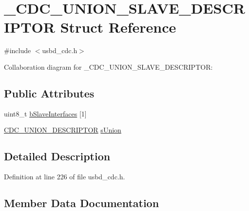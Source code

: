 \hypertarget{struct__CDC__UNION__1SLAVE__DESCRIPTOR}{}\section{\+\_\+\+C\+D\+C\+\_\+\+U\+N\+I\+O\+N\+\_\+S\+L\+A\+V\+E\+\_\+\+D\+E\+S\+C\+R\+I\+P\+T\+OR Struct Reference}
\label{struct__CDC__UNION__1SLAVE__DESCRIPTOR}


{\ttfamily \#include $<$usbd\+\_\+cdc.\+h$>$}



Collaboration diagram for \+\_\+\+C\+D\+C\+\_\+\+U\+N\+I\+O\+N\+\_\+S\+L\+A\+V\+E\+\_\+\+D\+E\+S\+C\+R\+I\+P\+T\+OR\+:
\subsection*{Public Attributes}
\begin{DoxyCompactItemize}
\item 
uint8\+\_\+t \hyperlink{struct__CDC__UNION__1SLAVE__DESCRIPTOR_a4a4b8383cd96d9ba6fa83b35bb32c94b}{b\+Slave\+Interfaces} \mbox{[}1\mbox{]}
\item 
\hyperlink{usbd__cdc_8h_abae3cc6753424f8383c5d46f674975b9}{C\+D\+C\+\_\+\+U\+N\+I\+O\+N\+\_\+\+D\+E\+S\+C\+R\+I\+P\+T\+OR} \hyperlink{struct__CDC__UNION__1SLAVE__DESCRIPTOR_a80ee9f0210ba596bfbeef771955c26a6}{s\+Union}
\end{DoxyCompactItemize}


\subsection{Detailed Description}


Definition at line 226 of file usbd\+\_\+cdc.\+h.



\subsection{Member Data Documentation}
